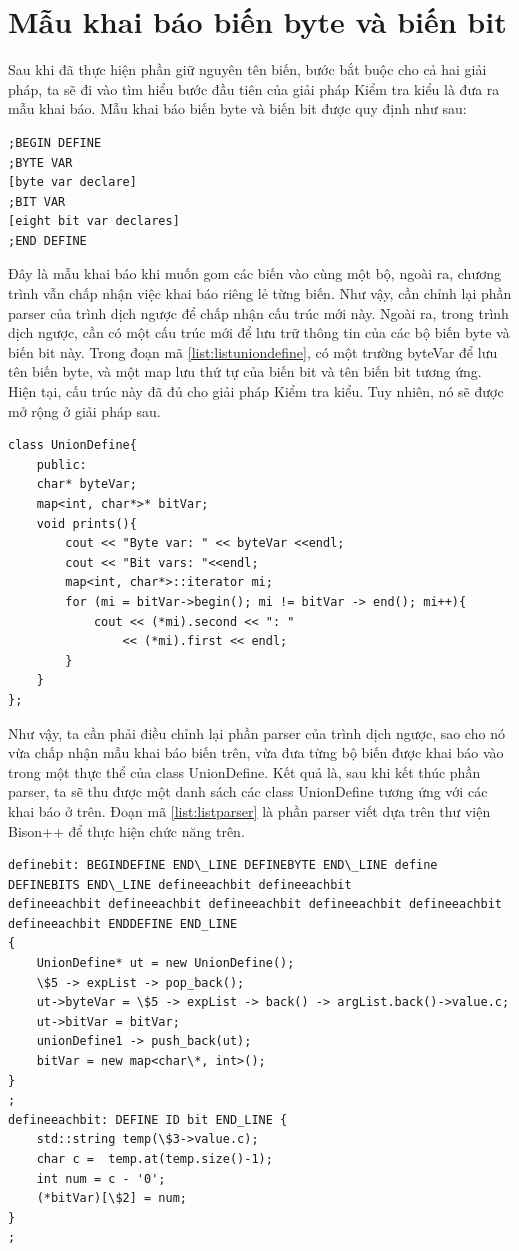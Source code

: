 \section{Mẫu khai báo biến byte và biến bit}
Sau khi đã thực hiện phần giữ nguyên tên biến, bước bắt buộc cho cả hai giải pháp, ta sẽ đi vào tìm hiểu bước đầu tiên của giải pháp Kiểm tra kiểu là đưa ra mẫu khai báo. Mẫu khai báo biến byte và biến bit được quy định như sau:
\begin{lstlisting}[caption={Mẫu khai báo bộ biến},label={list:listdeclarevar}]
;BEGIN DEFINE
;BYTE VAR
[byte var declare]
;BIT VAR
[eight bit var declares]
;END DEFINE
\end{lstlisting}
Đây là mẫu khai báo khi muốn gom các biến vào cùng một bộ, ngoài ra, chương trình vẫn chấp nhận việc khai báo riêng lẻ từng biến. Như vậy, cần chỉnh lại phần parser của trình dịch ngược để chấp nhận cấu trúc mới này. Ngoài ra, trong trình dịch ngược, cần có một cấu trúc mới để lưu trữ thông tin của các bộ biến byte và biến bit này. Trong đoạn mã \ref{list:listuniondefine}, có một trường byteVar để lưu tên biến byte, và một map lưu thứ tự của biến bit và tên biến bit tương ứng. Hiện tại, cấu trúc này đã đủ cho giải pháp Kiểm tra kiểu. Tuy nhiên, nó sẽ được mở rộng ở giải pháp sau. 
\begin{lstlisting}[caption={Cấu trúc dữ liệu để lưu trữ một bộ biến},label={list:listuniondefine}]
class UnionDefine{
	public:
	char* byteVar;
	map<int, char*>* bitVar;
	void prints(){
		cout << "Byte var: " << byteVar <<endl;
		cout << "Bit vars: "<<endl;
		map<int, char*>::iterator mi;
		for (mi = bitVar->begin(); mi != bitVar -> end(); mi++){
			cout << (*mi).second << ": " 
				<< (*mi).first << endl;
		}
	}
};
\end{lstlisting}
Như vậy, ta cần phải điều chỉnh lại phần parser của trình dịch ngược, sao cho nó vừa chấp nhận mẫu khai báo biến trên, vừa đưa từng bộ biến được khai báo vào trong một thực thể của class UnionDefine. Kết quả là, sau khi kết thúc phần parser, ta sẽ thu được một danh sách các class UnionDefine tương ứng với các khai báo ở trên. Đoạn mã \ref{list:listparser} là phần parser viết dựa trên thư viện Bison++ để thực hiện chức năng trên.\\
\begin{lstlisting}[caption={Đoạn mã parser cho phần khai báo bộ biến},label={list:listparser}]
definebit: BEGINDEFINE END\_LINE DEFINEBYTE END\_LINE define DEFINEBITS END\_LINE defineeachbit defineeachbit
defineeachbit defineeachbit defineeachbit defineeachbit defineeachbit defineeachbit ENDDEFINE END_LINE
{
	UnionDefine* ut = new UnionDefine();
	\$5 -> expList -> pop_back();
	ut->byteVar = \$5 -> expList -> back() -> argList.back()->value.c;
	ut->bitVar = bitVar;
	unionDefine1 -> push_back(ut);
	bitVar = new map<char\*, int>();
}
;
defineeachbit: DEFINE ID bit END_LINE {
	std::string temp(\$3->value.c);
	char c =  temp.at(temp.size()-1);
	int num = c - '0';
	(*bitVar)[\$2] = num;
}
;
\end{lstlisting}
